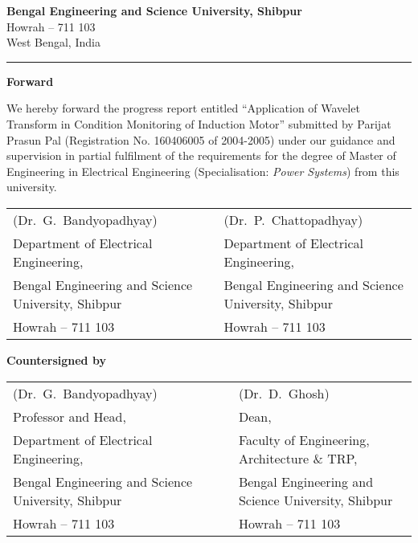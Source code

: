 \documentclass[a4paper,11pt]{article}
\begin{document}

\thispagestyle{empty}
\vspace*{7mm}
\begin{center}
{\Large \textbf{Bengal Engineering and Science University, Shibpur}}\\
\vspace{3.5pt}
{\large Howrah -- 711 103}\\
\vspace{3.5pt}
{\large West Bengal, India}
\end{center}
\hrule

\vspace{25mm}
\begin{center}
{\Large \textbf{Forward}}
\end{center}

\noindent We hereby forward the progress report entitled ``Application of Wavelet Transform in Condition Monitoring of Induction Motor'' submitted by Parijat Prasun Pal (Registration No. 160406005 of 2004-2005) under our guidance and supervision in partial fulfilment of the requirements for the degree of Master of Engineering in Electrical Engineering (Specialisation: \emph{Power Systems}) from this university.

\vspace{25mm}
\begin{flushleft}
\begin{tabular}{@{} lcl @{}}
(Dr.~G.~Bandyopadhyay) & & (Dr.~P.~Chattopadhyay)\\
{\footnotesize Department of Electrical Engineering,} & & {\footnotesize Department of Electrical Engineering,}\\
{\footnotesize Bengal Engineering and Science University, Shibpur} & & {\footnotesize Bengal Engineering and Science University, Shibpur}\\
{\footnotesize Howrah -- 711 103} & & {\footnotesize Howrah -- 711 103}
\end{tabular}

\vspace{20mm}
\noindent \textbf{Countersigned by}

\vspace{25mm}
\begin{tabular}{@{} lcl @{}}
(Dr.~G.~Bandyopadhyay)& & (Dr.~D.~Ghosh)\\
{\footnotesize Professor and Head,}& & {\footnotesize Dean,}\\
{\footnotesize Department of Electrical Engineering,}& &{\footnotesize Faculty of Engineering, Architecture \& TRP,}\\
{\footnotesize Bengal Engineering and Science University, Shibpur}& &{\footnotesize Bengal Engineering and Science University, Shibpur}\\
{\footnotesize Howrah -- 711 103}& &{\footnotesize Howrah -- 711 103}
\end{tabular}
\end{flushleft}
\clearpage
\end{document}
